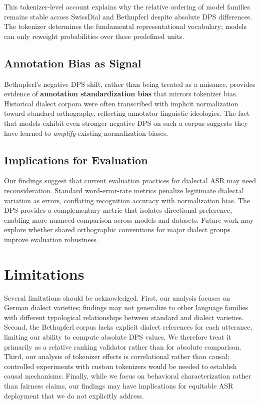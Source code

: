 \documentclass[11pt]{article}
\begin{document}
This tokenizer-level account explains why the relative ordering of model families remains stable across SwissDial and Bethupferl despite absolute DPS differences. The tokenizer determines the fundamental representational vocabulary; models can only reweight probabilities over these predefined units.

\subsection{Annotation Bias as Signal}

Bethupferl's negative DPS shift, rather than being treated as a nuisance, provides evidence of \textbf{annotation standardization bias} that mirrors tokenizer bias. Historical dialect corpora were often transcribed with implicit normalization toward standard orthography, reflecting annotator linguistic ideologies. The fact that models exhibit even stronger negative DPS on such a corpus suggests they have learned to \textit{amplify} existing normalization biases.

\subsection{Implications for Evaluation}

Our findings suggest that current evaluation practices for dialectal ASR may need reconsideration. Standard word-error-rate metrics penalize legitimate dialectal variation as errors, conflating recognition accuracy with normalization bias. The DPS provides a complementary metric that isolates directional preference, enabling more nuanced comparison across models and datasets. Future work may explore whether shared orthographic conventions for major dialect groups improve evaluation robustness.

\section{Limitations}

Several limitations should be acknowledged. First, our analysis focuses on German dialect varieties; findings may not generalize to other language families with different typological relationships between standard and dialect varieties. Second, the Bethupferl corpus lacks explicit dialect references for each utterance, limiting our ability to compute absolute DPS values. We therefore treat it primarily as a relative ranking validator rather than for absolute comparison. Third, our analysis of tokenizer effects is correlational rather than causal; controlled experiments with custom tokenizers would be needed to establish causal mechanisms. Finally, while we focus on behavioral characterization rather than fairness claims, our findings may have implications for equitable ASR deployment that we do not explicitly address.
\end{document}
